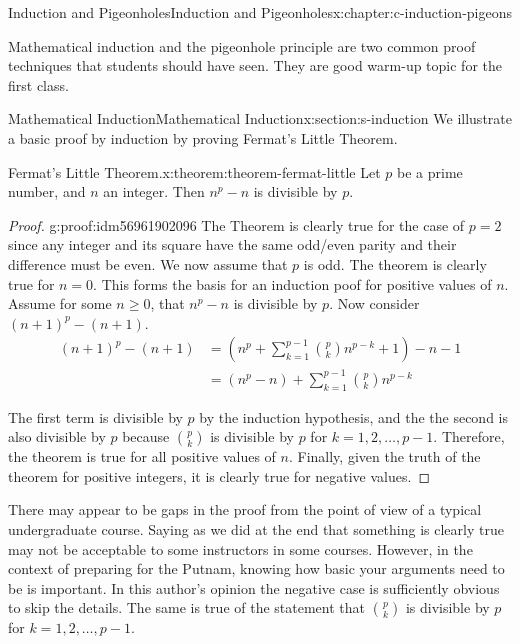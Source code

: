 \documentclass[twoside,10pt,]{book}
\numberwithin{equation}{section}
\newcommand{\amp}{&}
\begin{document}
\begin{chapterptx}{Induction and Pigeonholes}{}{Induction and Pigeonholes}{}{}{x:chapter:c-induction-pigeons}
\begin{introduction}{}%
Mathematical induction and the pigeonhole principle are two common proof techniques that students should have seen.  They are good warm-up topic for the first class.%
\end{introduction}%
%
%
\typeout{************************************************}
\typeout{************************************************}
%
\begin{sectionptx}{Mathematical Induction}{}{Mathematical Induction}{}{}{x:section:s-induction}
%
We illustrate a basic proof by induction by proving Fermat's Little Theorem.%
\begin{theorem}{Fermat's Little Theorem.}{}{x:theorem:theorem-fermat-little}%
%
Let \(p\) be a prime number, and \(n\) an integer. Then \(n^p - n\) is divisible by \(p\).%
\end{theorem}
\begin{proof}{}{g:proof:idm56961902096}
The Theorem is clearly true for the case of \(p=2\) since any integer and its square have the same odd\slash{}even parity and their difference must be even.   We now assume that \(p\) is odd.   The theorem is clearly true for \(n=0\).  This forms the basis for an induction poof for positive values of \(n\).  Assume for some \(n \geq 0\), that  \(n^p - n\) is divisible by \(p\).  Now consider  \((n+1)^p - (n+1)\).%
\begin{align*}
(n+1)^p - (n+1) \amp=   \left( n^p+\sum_{k=1}^{p-1} { \binom{p}{k} n^{p-k} } + 1\right) -n -1 \\
\amp= (n^p -n)  +\sum_{k=1}^{p-1} {\binom{p}{k} n^{p-k} }
\end{align*}
%
\par
The first term is divisible by \(p\) by the induction hypothesis, and the the second is also divisible by \(p\) because \(\binom{p}{k}\) is divisible by \(p\) for \(k = 1, 2,\dots,p-1\).  Therefore, the theorem is true for all positive values of \(n\).  Finally, given the truth of the theorem for positive integers, it is clearly true for negative values.%
\end{proof}
There may appear to be gaps in the proof from the point of view of a typical undergraduate course. Saying as we did at the end that something is clearly true may not be acceptable to some instructors in some courses.  However, in the context of preparing for the Putnam, knowing how basic your arguments need to be is important.  In this author's opinion the negative case is sufficiently obvious to skip the details. The same is true of the statement that \(\binom{p}{k}\) is divisible by \(p\) for \(k = 1, 2,\dots,p-1\).%

\end{sectionptx}
\end{chapterptx}
\end{document}
